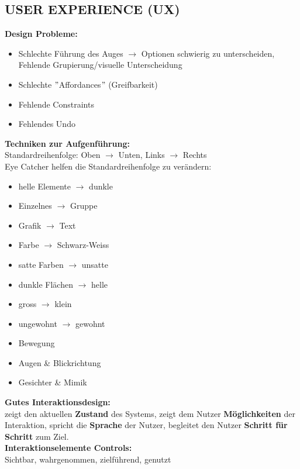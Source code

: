 \documentclass[7pt,landscape,a4paper]{scrartcl}
\begin{document}
\begin{multicols*}{4}
\section{USER EXPERIENCE (UX)}
	\textcolor{b}{\textbf{Design Probleme:}}
	\begin{itemize}[topsep=0pt, leftmargin=3mm]
		\setlength\itemsep{-0.3em}
		\item Schlechte Führung des Auges $\rightarrow$ Optionen schwierig zu unterscheiden, Fehlende Grupierung/visuelle Unterscheidung
		\item Schlechte $"$Affordances$"$ (Greifbarkeit)
		\item Fehlende Constraints
		\item Fehlendes Undo
	\end{itemize}
	\textcolor{b}{\textbf{Techniken zur Aufgenführung:}}\\
	Standardreihenfolge: Oben $\rightarrow$ Unten, Links $\rightarrow$ Rechts\\
	Eye Catcher helfen die Standardreihenfolge zu verändern:
	\begin{itemize}[topsep=0pt, leftmargin=3mm]
		\setlength\itemsep{-0.3em}
		\item helle Elemente $\rightarrow$ dunkle
		\item Einzelnes $\rightarrow$ Gruppe
		\item Grafik $\rightarrow$ Text
		\item Farbe $\rightarrow$ Schwarz-Weiss
		\item satte Farben $\rightarrow$ unsatte
		\item dunkle Flächen $\rightarrow$ helle
		\item gross $\rightarrow$ klein
		\item ungewohnt $\rightarrow$ gewohnt
		\item Bewegung
		\item Augen \& Blickrichtung
		\item Gesichter \& Mimik
	\end{itemize}
	\textcolor{b}{\textbf{Gutes Interaktionsdesign:}}\\
	zeigt den aktuellen \textbf{Zustand} des Systems, zeigt dem Nutzer \textbf{Möglichkeiten} der Interaktion, spricht die \textbf{Sprache} der Nutzer, begleitet den Nutzer \textbf{Schritt für Schritt} zum Ziel.\\
	\textcolor{b}{\textbf{Interaktionselemente Controls:}}\\
	Sichtbar, wahrgenommen, zielführend, genutzt\\

\end{multicols*}
\end{document}
